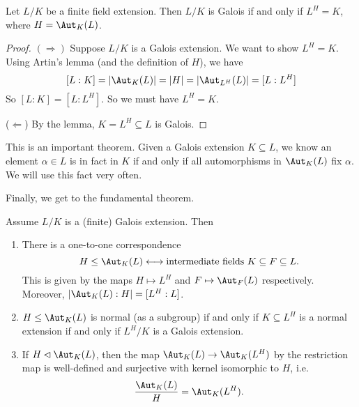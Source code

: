 \documentclass[a4paper]{article}
\begin{document}
\begin{thm}
  Let $L/K$ be a finite field extension. Then $L/K$ is Galois if and only if $L^H = K$, where $H = \Aut_K(L)$.
\end{thm}

\begin{proof}
  $(\Rightarrow)$ Suppose $L/K$ is a Galois extension. We want to show $L^H = K$. Using Artin's lemma (and the definition of $H$), we have
  \[
    [L:K] = |\Aut_K(L)| = |H| = |\Aut_{L^H}(L)| = [L:L^H]
  \]
  So $[L:K] = [L:L^H]$. So we must have $L^H = K$.

  ($\Leftarrow$) By the lemma, $K = L^H \subseteq L$ is Galois.
\end{proof}

This is an important theorem. Given a Galois extension $K \subseteq L$, we know an element $\alpha \in L$ is in fact in $K$ if and only if all automorphisms in $\Aut_K(L)$ fix $\alpha$. We will use this fact very often.

Finally, we get to the fundamental theorem.
\begin{thm}
  Assume $L/K$ is a (finite) Galois extension. Then
  \begin{enumerate}
    \item There is a one-to-one correspondence
      \[
        H\leq \Aut_K(L) \longleftrightarrow \text{intermediate fields }K\subseteq F \subseteq L.
      \]
      This is given by the maps $H \mapsto L^H$ and $F\mapsto \Aut_F(L)$ respectively. Moreover, $|\Aut_K(L):H| = [L^H:L]$.
    \item $H\leq \Aut_K(L)$ is normal (as a subgroup) if and only if $K \subseteq L^H$ is a normal extension if and only if $L^H/K$ is a Galois extension.
    \item If $H\lhd \Aut_K(L)$, then the map $\Aut_K(L) \to \Aut_K(L^H)$ by the restriction map is well-defined and surjective with kernel isomorphic to $H$, i.e.
      \[
        \frac{\Aut_K(L)}{H} = \Aut_K(L^H).
      \]
  \end{enumerate}
\end{thm}
\end{document}
